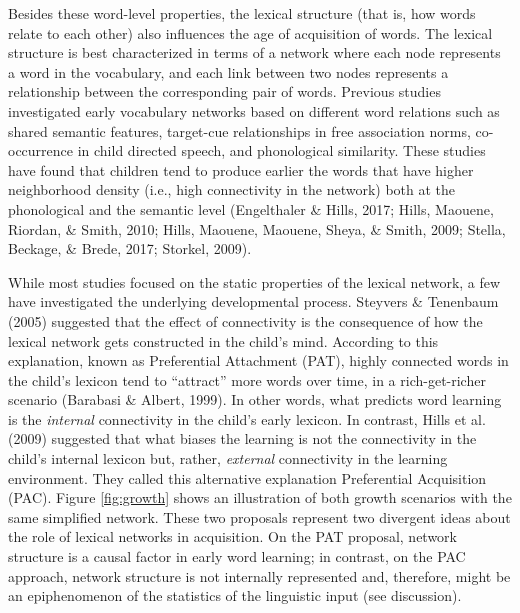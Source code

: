 \documentclass[10pt, letterpaper]{article}
\begin{document}
Besides these word-level properties, the lexical structure (that is, how
words relate to each other) also influences the age of acquisition of
words. The lexical structure is best characterized in terms of a network
where each node represents a word in the vocabulary, and each link
between two nodes represents a relationship between the corresponding
pair of words. Previous studies investigated early vocabulary networks
based on different word relations such as shared semantic features,
target-cue relationships in free association norms, co-occurrence in
child directed speech, and phonological similarity. These studies have
found that children tend to produce earlier the words that have higher
neighborhood density (i.e., high connectivity in the network) both at
the phonological and the semantic level (Engelthaler \& Hills, 2017;
Hills, Maouene, Riordan, \& Smith, 2010; Hills, Maouene, Maouene, Sheya,
\& Smith, 2009; Stella, Beckage, \& Brede, 2017; Storkel, 2009).

While most studies focused on the static properties of the lexical
network, a few have investigated the underlying developmental process.
Steyvers \& Tenenbaum (2005) suggested that the effect of connectivity
is the consequence of how the lexical network gets constructed in the
child's mind. According to this explanation, known as Preferential
Attachment (PAT), highly connected words in the child's lexicon tend to
``attract'' more words over time, in a rich-get-richer scenario
(Barabasi \& Albert, 1999). In other words, what predicts word learning
is the \emph{internal} connectivity in the child's early lexicon. In
contrast, Hills et al. (2009) suggested that what biases the learning is
not the connectivity in the child's internal lexicon but, rather,
\emph{external} connectivity in the learning environment. They called
this alternative explanation Preferential Acquisition (PAC). Figure
\ref{fig:growth} shows an illustration of both growth scenarios with the
same simplified network. These two proposals represent two divergent
ideas about the role of lexical networks in acquisition. On the PAT
proposal, network structure is a causal factor in early word learning;
in contrast, on the PAC approach, network structure is not internally
represented and, therefore, might be an epiphenomenon of the statistics
of the linguistic input (see discussion).
\end{document}
